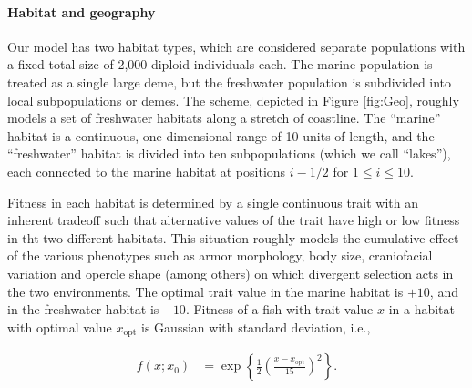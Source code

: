 \documentclass{article}
\begin{document}
\paragraph{Habitat and geography}
Our model has two habitat types, which are considered separate populations with a fixed total size of 2,000 diploid individuals each. The marine population is treated as a single large deme, but the freshwater population is subdivided into local subpopulations or demes. The scheme, depicted in Figure \ref{fig:Geo}, roughly models a set of freshwater habitats along a stretch of coastline. The ``marine'' habitat  is a continuous, one-dimensional range of 10 units of length, and the ``freshwater'' habitat is divided into ten subpopulations (which we call ``lakes''), each connected to the marine habitat at positions $i - 1/2$ for $1 \le i \le 10$.

Fitness in each habitat is determined by a single continuous trait with an inherent tradeoff such that alternative values of the trait have high or low fitness in tht two different habitats. This situation roughly models the cumulative effect of the various phenotypes such as armor morphology, body size, craniofacial variation and opercle shape (among others) on which divergent selection acts in the two environments. The optimal trait value in the marine habitat is $+10$, and in the freshwater habitat is $-10$. Fitness of a fish with trait value $x$ in a habitat with optimal value $x_\text{opt}$ is Gaussian with standard deviation, i.e.,

\begin{align*}
    f(x; x_0)
    &=
    \exp\left\{
        \frac{1}{2}
            \left(
            \frac{x-x_\text{opt}}{15}
            \right)^2
        \right\} .
\end{align*}
\end{document}
